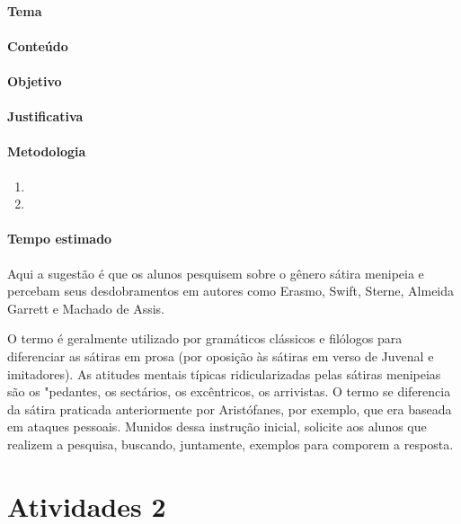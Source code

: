 \documentclass[12pt]{extarticle}
\begin{document}
\paragraph{Tema}

\paragraph{Conteúdo}

\paragraph{Objetivo}

\paragraph{Justificativa}

\paragraph{Metodologia}
\begin{enumerate}
	\item
	\item
\end{enumerate}

\paragraph{Tempo estimado}

Aqui a sugestão é que os alunos pesquisem sobre o gênero
sátira menipeia e percebam seus desdobramentos em autores como Erasmo,
Swift, Sterne, Almeida Garrett e Machado de Assis.

O termo é geralmente utilizado por gramáticos clássicos e filólogos para
diferenciar as sátiras em prosa (por oposição às sátiras em verso de
Juvenal e imitadores). As atitudes mentais típicas ridicularizadas pelas
sátiras menipeias são os "pedantes, os sectários, os excêntricos, os
arrivistas. O termo se diferencia da sátira praticada anteriormente por
Aristófanes, por exemplo, que era baseada em ataques pessoais. Munidos
dessa instrução inicial, solicite aos alunos que realizem a pesquisa,
buscando, juntamente, exemplos para comporem a resposta.

\section{Atividades 2}

\end{document}
